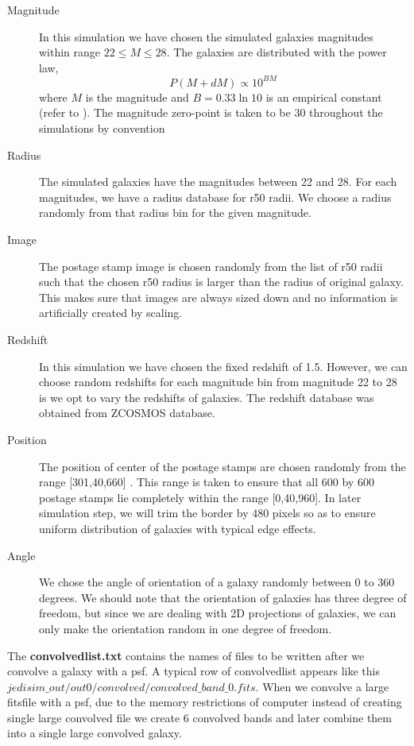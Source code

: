 \begin{description}
\item[Magnitude]
In this simulation we have chosen the simulated galaxies magnitudes within range $22 \le M \le 28$. The galaxies are distributed with the power law,
\begin{equation}
  P(M+dM) \propto 10^{BM}
  \label{eq:mag_power_law}
\end{equation}
    where $M$ is the magnitude and $B = 0.33\ln 10$ is an empirical constant (refer to \cite{benitez_04}). The magnitude zero-point is taken to be 30 throughout the simulations by convention

\item[Radius] The simulated galaxies have the magnitudes between 22 and 28. For each magnitudes, we have a radius database for r50 radii. We choose a radius randomly from that radius bin for the given magnitude.

\item[Image] The postage stamp image is chosen randomly from the list of r50 radii such that the chosen r50 radius
is larger than the radius of original galaxy. This makes 
sure that images are always sized down and no information is artificially created by scaling.

\item[Redshift] In this simulation we have chosen the fixed redshift of 1.5. However, we can choose random redshifts for each magnitude bin from magnitude 22 to 28 is we opt to vary the redshifts of galaxies. The redshift database was obtained from ZCOSMOS database.

\item[Position] The position of center of the postage stamps are chosen randomly 
from the range [301,40,660] . This range is taken to ensure that all 600 by 600
postage stamps lie completely within the range [0,40,960]. In later simulation step, we will trim the border by 480 pixels so as to ensure uniform distribution
of galaxies with typical edge effects.

\item[Angle] We chose the angle of orientation of a galaxy randomly between 0 to 360 degrees. We should note that the orientation of galaxies has three degree of
freedom, but since we are dealing with 2D projections of galaxies, we can only make the orientation random in one degree of freedom.

\end{description}
The \textbf{convolvedlist.txt} contains the names of files to be written after we convolve a galaxy with a psf. A typical row of
convolvedlist appears like this $jedisim\_out/out0/convolved/convolved\_band\_0.fits$. When we convolve a large fitsfile with a psf, due to the memory restrictions of computer instead of creating single large convolved file we create 6 convolved bands and later combine them into a single large convolved galaxy.

